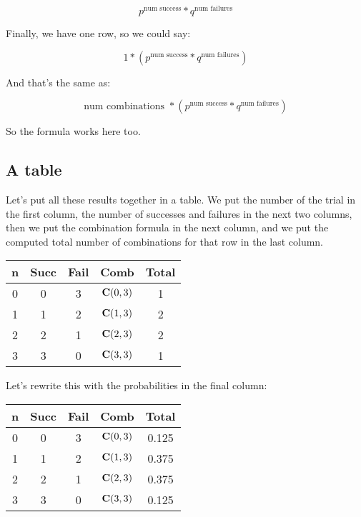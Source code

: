 \documentclass[../../../main.tex]{subfiles}
\begin{document}
\begin{equation*}
    p^{\text{num success}} * q^{\text{num failures}}
\end{equation*}

Finally, we have one row, so we could say:

\begin{equation*}
    1 * (p^{\text{num success}} * q^{\text{num failures}})
\end{equation*}

And that's the same as:

\begin{equation*}
    \text{num combinations } * (p^{\text{num success}} * q^{\text{num failures}})
\end{equation*}

So the formula works here too.


\subsection{A table}

Let's put all these results together in a table. We put the number of the trial in the first column, the number of successes and failures in the next two columns, then we put the combination formula in the next column, and we put the computed total number of combinations for that row in the last column.

\begin{center}
  \begin{tabular}{| c | c | c | c | c |}
    \hline
  \textbf{n} & \textbf{Succ} & \textbf{Fail} & \textbf{Comb} & \textbf{Total} \\ \hline
  0 & 0    & 3    & $\mathbf{C}(0, 3)$ & 1 \\ \hline
  1 & 1    & 2    & $\mathbf{C}(1, 3)$ & 2 \\ \hline
  2 & 2    & 1    & $\mathbf{C}(2, 3)$ & 2 \\ \hline
  3 & 3    & 0    & $\mathbf{C}(3, 3)$ & 1 \\ \hline
  \end{tabular}
\end{center}

\noindent
Let's rewrite this with the probabilities in the final column:

\begin{center}
  \begin{tabular}{| c | c | c | c | c |}
    \hline
  \textbf{n} & \textbf{Succ} & \textbf{Fail} & \textbf{Comb} & \textbf{Total} \\ \hline
  0 & 0    & 3    & $\mathbf{C}(0, 3)$ & 0.125 \\ \hline
  1 & 1    & 2    & $\mathbf{C}(1, 3)$ & 0.375 \\ \hline
  2 & 2    & 1    & $\mathbf{C}(2, 3)$ & 0.375 \\ \hline
  3 & 3    & 0    & $\mathbf{C}(3, 3)$ & 0.125 \\ \hline
  \end{tabular}
\end{center}
\end{document}
